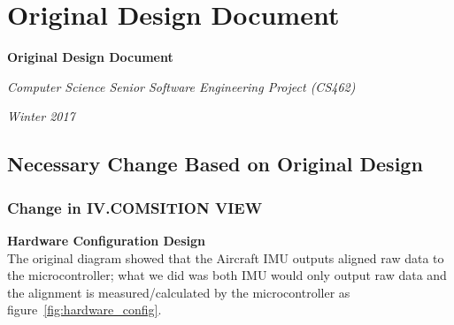 \newpage
\section{Original Design Document}
\def\DDtitle{Computer Science Senior Software Engineering Project (CS462)}
\def\DDterm{Winter 2017}
	\begin{center}
		\vspace{\fill}

		{\Huge\bfseries Original Design Document\par}
		\vspace{0.5cm}
		{\Large\itshape \DDtitle\par}
		\vspace{0.5cm}
		{\Large\itshape \DDterm\par}
		
		\vspace{\fill}
	\end{center}
	\begin{abstract}
		A Head-up Display (HUD) Alignment system is developed as a proof of concept aims to explore a potential technological innovation for the HUD system that presents critical flight information to pilots. The primary objective of this project is to reduce the cost and time required to precisely align flight information to the HUD by introducing an additional sensor component to the system to make the alignment process more dynamic. This document is intended for use by Rockwell Collins and their HUD system development team. This document provides and explains an overall system framework, design viewpoints and specific design description for each viewpoint within the system.
	\end{abstract}
	
	

\newpage
	\subsection{Necessary Change Based on Original Design}
		\subsubsection{Change in IV.COMSITION VIEW}
			\textbf{Hardware Configuration Design}
			\\ \indent The original diagram showed that the Aircraft IMU outputs aligned raw data to the microcontroller; what we did was both IMU would only output raw data and the alignment is measured/calculated by the microcontroller as figure~\ref{fig:hardware_config}.\\

